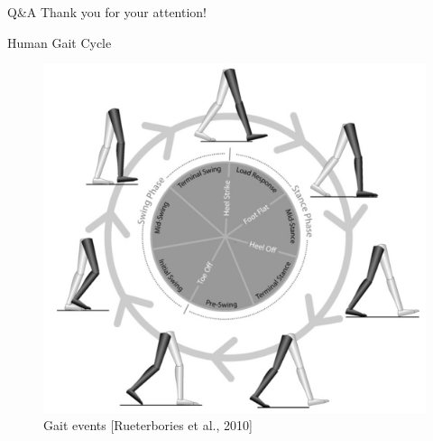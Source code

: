 \documentclass{beamer}
\begin{document}
\begin{frame}{Q\&A}
    \Large
    \centering
    Thank you for your attention!
\end{frame}

\begin{frame}{Human Gait Cycle}
    \begin{figure}[H]
    \begin{center}
        \includegraphics[height=.8\textheight]{figures/gait_events.jpg}
        \caption{Gait events [Rueterbories et al., 2010]}
        \label{fig:gait_events}
    \end{center}
    \end{figure}
\end{frame}
\end{document}
